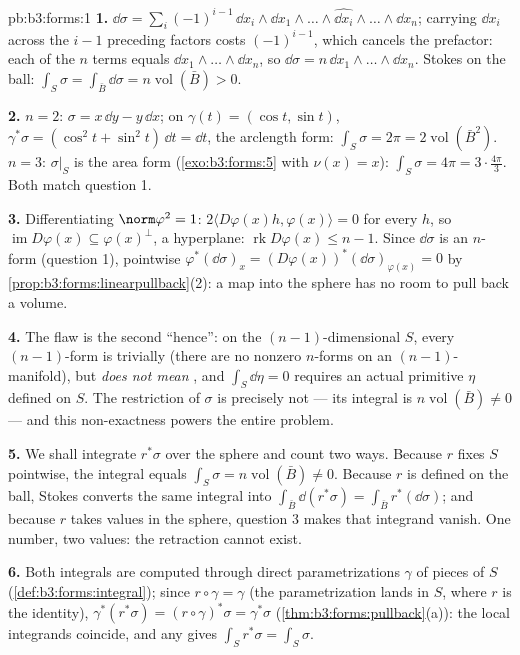 \begin{solution}{pb:b3:forms:1}
\textbf{1.} $\dd\sigma = \sum_i(-1)^{i-1}\,\dd x_i\wedge\dd
x_1\wedge\dots\wedge\widehat{\dd x_i}\wedge\dots\wedge\dd
x_n$; carrying $\dd x_i$ across the $i-1$ preceding factors
costs $(-1)^{i-1}$, which cancels the prefactor: each of the
$n$ terms equals $\dd x_1\wedge\dots\wedge\dd x_n$, so
$\dd\sigma = n\,\dd x_1\wedge\dots\wedge\dd x_n$. Stokes on
the ball: $\int_S\sigma = \int_{\bar B}\dd\sigma =
n\operatorname{vol}(\bar B) > 0$.

\textbf{2.} $n = 2$: $\sigma = x\,\dd y - y\,\dd x$; on
$\gamma(t) = (\cos t, \sin t)$, $\gamma^*\sigma = (\cos^2t +
\sin^2t)\,\dd t = \dd t$, the arclength form:
$\int_S\sigma = 2\pi = 2\operatorname{vol}(\bar B^2)$.
$n = 3$: $\sigma\vert_S$ is the area form
(\cref{exo:b3:forms:5} with $\nu(x) = x$):
$\int_S\sigma = 4\pi = 3\cdot\tfrac{4\pi}3$. Both match
question 1.

\textbf{3.} Differentiating $\norm\varphi^2 = 1$: $2\langle
D\varphi(x)h, \varphi(x)\rangle = 0$ for every $h$, so
$\operatorname{im}D\varphi(x) \subseteq \varphi(x)^\perp$, a
hyperplane: $\operatorname{rk}D\varphi(x) \leq n - 1$. Since
$\dd\sigma$ is an $n$-form (question 1), pointwise
$\varphi^*(\dd\sigma)_x =
(D\varphi(x))^*(\dd\sigma)_{\varphi(x)} = 0$ by
\cref{prop:b3:forms:linearpullback}(2): a map into the
sphere has no room to pull back a volume.

\textbf{4.} The flaw is the second ``hence'': on the
$(n-1)$-dimensional $S$, every $(n-1)$-form is trivially
 (there are no nonzero $n$-forms on an
$(n-1)$-manifold), but \emph{ does not mean },
and $\int_S\dd\eta = 0$ requires an actual primitive $\eta$
defined on $S$. The restriction of $\sigma$ is precisely not
 --- its integral is $n\operatorname{vol}(\bar B) \neq
0$ --- and this non-exactness powers the entire problem.

\textbf{5.} We shall integrate $r^*\sigma$ over the sphere
and count two ways. Because $r$ fixes $S$ pointwise, the
integral equals $\int_S\sigma = n\operatorname{vol}(\bar B)
\neq 0$. Because $r$ is defined on the ball, Stokes converts
the same integral into $\int_{\bar B}\dd(r^*\sigma) =
\int_{\bar B}r^*(\dd\sigma)$; and because $r$ takes values
in the sphere, question 3 makes that integrand vanish. One
number, two values: the retraction cannot exist.

\textbf{6.} Both integrals are computed through direct
parametrizations $\gamma$ of pieces of $S$
(\cref{def:b3:forms:integral}); since $r\circ\gamma =
\gamma$ (the parametrization lands in $S$, where $r$ is the
identity), $\gamma^*(r^*\sigma) = (r\circ\gamma)^*\sigma =
\gamma^*\sigma$ (\cref{thm:b3:forms:pullback}(a)): the local
integrands coincide, and any  gives
$\int_Sr^*\sigma = \int_S\sigma$.


\end{solution}
